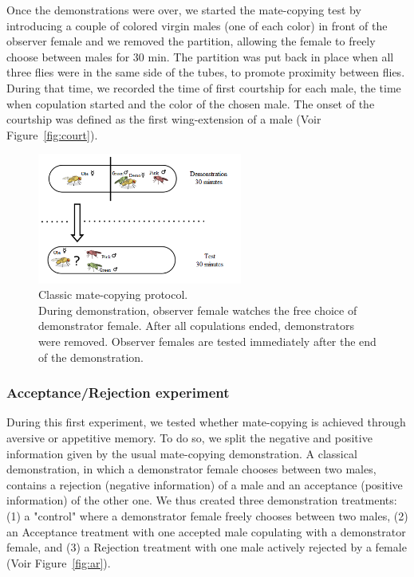 \documentclass[a4paper, 12pt]{article}
\begin{document}
	Once the demonstrations were over, we started the mate-copying test by introducing a couple of colored virgin males (one of each color) in front of the observer female and we removed the partition, allowing the female to freely choose between males for 30 min. The partition was put back in place when all three flies were in the same side of the tubes, to promote proximity between flies. During that time, we recorded the time of first courtship for each male, the time when copulation started and the color of the chosen male. The onset of the courtship was defined as the first wing-extension of a male (Voir Figure~\ref{fig:court}).
	
	

	\begin{figure}
	\centering
	\includegraphics[width=0.6\textwidth]{images/classic}
	\caption{Classic mate-copying protocol.\\ 
		During demonstration, observer female watches the free choice of demonstrator female. After all copulations ended, demonstrators were removed. Observer females are tested immediately after the end of the demonstration.}
	\label{fig:classic}
\end{figure}

	\subsubsection{Acceptance/Rejection experiment}
	
	During this first experiment, we tested whether mate-copying is achieved through aversive or appetitive memory. To do so, we split the negative and positive information given by the usual mate-copying demonstration. A classical demonstration, in which a demonstrator female chooses between two males, contains a rejection (negative information) of a male and an acceptance (positive information) of the other one. We thus created three demonstration treatments: (1) a "control" where a demonstrator female freely chooses between two males, (2) an Acceptance treatment with one accepted male copulating with a demonstrator female, and (3) a Rejection treatment with one male actively rejected by a female (Voir Figure~\ref{fig:ar}).
	
\end{document}
